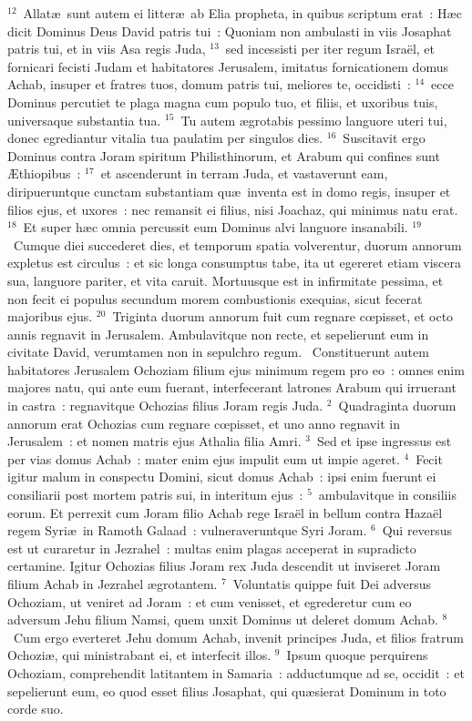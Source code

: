 ${}^{12}$~Allat\ae\ sunt autem ei litter\ae\ ab Elia propheta, in quibus scriptum erat~: H\ae c dicit Dominus Deus David patris tui~: Quoniam non ambulasti in viis Josaphat patris tui, et in viis Asa regis Juda,
${}^{13}$~sed incessisti per iter regum Isra\"el, et fornicari fecisti Judam et habitatores Jerusalem, imitatus fornicationem domus Achab, insuper et fratres tuos, domum patris tui, meliores te, occidisti~:
${}^{14}$~ecce Dominus percutiet te plaga magna cum populo tuo, et filiis, et uxoribus tuis, universaque substantia tua.
${}^{15}$~Tu autem \ae grotabis pessimo languore uteri tui, donec egrediantur vitalia tua paulatim per singulos dies.
${}^{16}$~Suscitavit ergo Dominus contra Joram spiritum Philisthinorum, et Arabum qui confines sunt \AE thiopibus~:
${}^{17}$~et ascenderunt in terram Juda, et vastaverunt eam, diripueruntque cunctam substantiam qu\ae\ inventa est in domo regis, insuper et filios ejus, et uxores~: nec remansit ei filius, nisi Joachaz, qui minimus natu erat.
${}^{18}$~Et super h\ae c omnia percussit eum Dominus alvi languore insanabili.
${}^{19}$~Cumque diei succederet dies, et temporum spatia volverentur, duorum annorum expletus est circulus~: et sic longa consumptus tabe, ita ut egereret etiam viscera sua, languore pariter, et vita caruit. Mortuusque est in infirmitate pessima, et non fecit ei populus secundum morem combustionis exequias, sicut fecerat majoribus ejus.
${}^{20}$~Triginta duorum annorum fuit cum regnare cœpisset, et octo annis regnavit in Jerusalem. Ambulavitque non recte, et sepelierunt eum in civitate David, verumtamen non in sepulchro regum.
~Constituerunt autem habitatores Jerusalem Ochoziam filium ejus minimum regem pro eo~: omnes enim majores natu, qui ante eum fuerant, interfecerant latrones Arabum qui irruerant in castra~: regnavitque Ochozias filius Joram regis Juda.
${}^{2}$~Quadraginta duorum annorum erat Ochozias cum regnare cœpisset, et uno anno regnavit in Jerusalem~: et nomen matris ejus Athalia filia Amri.
${}^{3}$~Sed et ipse ingressus est per vias domus Achab~: mater enim ejus impulit eum ut impie ageret.
${}^{4}$~Fecit igitur malum in conspectu Domini, sicut domus Achab~: ipsi enim fuerunt ei consiliarii post mortem patris sui, in interitum ejus~:
${}^{5}$~ambulavitque in consiliis eorum. Et perrexit cum Joram filio Achab rege Isra\"el in bellum contra Haza\"el regem Syri\ae\ in Ramoth Galaad~: vulneraveruntque Syri Joram.
${}^{6}$~Qui reversus est ut curaretur in Jezrahel~: multas enim plagas acceperat in supradicto certamine. Igitur Ochozias filius Joram rex Juda descendit ut inviseret Joram filium Achab in Jezrahel \ae grotantem.
${}^{7}$~Voluntatis quippe fuit Dei adversus Ochoziam, ut veniret ad Joram~: et cum venisset, et egrederetur cum eo adversum Jehu filium Namsi, quem unxit Dominus ut deleret domum Achab.
${}^{8}$~Cum ergo everteret Jehu domum Achab, invenit principes Juda, et filios fratrum Ochozi\ae , qui ministrabant ei, et interfecit illos.
${}^{9}$~Ipsum quoque perquirens Ochoziam, comprehendit latitantem in Samaria~: adductumque ad se, occidit~: et sepelierunt eum, eo quod esset filius Josaphat, qui qu\ae sierat Dominum in toto corde suo.

